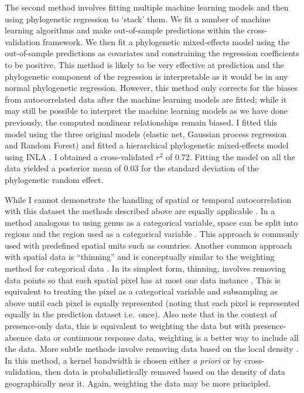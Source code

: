 \documentclass[10pt,]{article}
\begin{document}
The second method involves fitting multiple machine learning models and then using phylogenetic regression to `stack' them.
We fit a number of machine learning algorithms and make out-of-sample predictions within the cross-validation framework.
We then fit a phylogenetic mixed-effects model using the out-of-sample predictions as covariates and constraining the regression coefficients to be positive.
This method is likely to be very effective at prediction and the phylogenetic component of the regression is interpretable as it would be in any normal phylogenetic regression.
However, this method only corrects for the biases from autocorrelated data after the machine learning models are fitted; while it may still be possible to interpret the machine learning models as we have done previously, the computed nonlinear relationships remain biased.
I fitted this model using the three original models (elastic net, Gaussian process regression and Random Forest) and fitted a hierarchical phylogenetic mixed-effects model using INLA \citep{INLA}.
I obtained a cross-validated \(r^2\) of 0.72.
Fitting the model on all the data yielded a posterior mean of 0.03 for the standard deviation of the phylogenetic random effect.

While I cannot demonstrate the handling of spatial or temporal autocorrelation with this dataset the methods described above are equally applicable \citep{elith2009species}.
In a method analogous to using genus as a categorical variable, space can be split into regions and the region used as a categorical variable \citep{appelhans2015evaluating}.
This approach is commonly used with predefined spatial units such as countries.
Another common approach with spatial data is ``thinning'' and is conceptually similar to the weighting method for categorical data \citep{elith2010art}.
In its simplest form, thinning, involves removing data points so that each spatial pixel has at most one data instance \citep{elith2010art, verbruggen2013improving}.
This is equivalent to treating the pixel as a categorical variable and subsampling as above until each pixel is equally represented (noting that each pixel is represented equally in the prediction dataset i.e.~once).
Also note that in the context of presence-only data, this is equivalent to weighting the data but with presence-absence data or continuous response data, weighting is a better way to include all the data.
More subtle methods involve removing data based on the local density \citep{verbruggen2013improving}.
In this method, a kernel bandwidth is chosen either \emph{a priori} or by cross-validation, then data is probabilistically removed based on the density of data geographically near it.
Again, weighting the data may be more principled.
\end{document}
